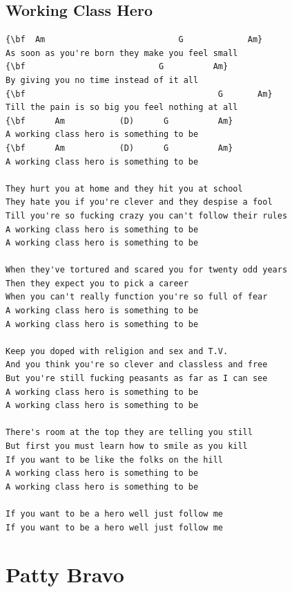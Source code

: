 \documentclass[a4paper]{article}
\begin{document}
\subsection{Working Class Hero}
\begin{Verbatim}[commandchars=\\\{\}]
{\bf  Am                           G             Am}
As soon as you're born they make you feel small
{\bf                           G          Am}
By giving you no time instead of it all
{\bf                                       G       Am}
Till the pain is so big you feel nothing at all
{\bf      Am           (D)      G          Am}
A working class hero is something to be
{\bf      Am           (D)      G          Am}
A working class hero is something to be

They hurt you at home and they hit you at school
They hate you if you're clever and they despise a fool
Till you're so fucking crazy you can't follow their rules
A working class hero is something to be
A working class hero is something to be

When they've tortured and scared you for twenty odd years
Then they expect you to pick a career
When you can't really function you're so full of fear
A working class hero is something to be
A working class hero is something to be

Keep you doped with religion and sex and T.V.
And you think you're so clever and classless and free
But you're still fucking peasants as far as I can see
A working class hero is something to be
A working class hero is something to be

There's room at the top they are telling you still
But first you must learn how to smile as you kill
If you want to be like the folks on the hill
A working class hero is something to be
A working class hero is something to be

If you want to be a hero well just follow me
If you want to be a hero well just follow me

\end{Verbatim}
\newpage
\section{Patty Bravo}
\end{document}
